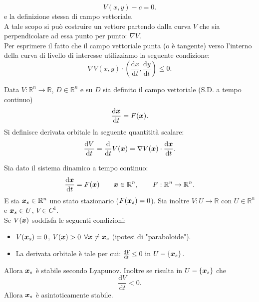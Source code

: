 \[
    V(x, y) - c = 0
.\] 
e la definizione stessa di campo vettoriale.\\
A tale scopo si può costruire un vettore partendo dalla curva $V$ che sia perpendicolare ad essa punto per punto:  $\nabla V$.\\
Per esprimere il fatto che il campo vettoriale punta (o è tangente) verso l'interno della curva di livello di interesse utilizziamo la seguente condizione:
\[
    \nabla V(x, y) \cdot (\frac{\text{d} x}{\text{d} t} , \frac{\text{d} y}{\text{d} t} ) \le 0
.\] 
\begin{defn}
    Data $V:\mathbb{R}^n\to \mathbb{R}$, $D \in \mathbb{R}^n $ e su $D$ sia definito il campo vettoriale (S.D. a tempo continuo)
    \[
	\frac{\text{d} \boldsymbol{x}}{\text{d} t} = F(\boldsymbol{x}) 
    .\] 
    Si definisce derivata orbitale la seguente quantitità scalare:
    \[
	\frac{\text{d} V}{\text{d} t} = \frac{\text{d} }{\text{d} t} V(\boldsymbol{x}) = \nabla V(\boldsymbol{x}) \cdot \frac{\text{d} \boldsymbol{x}}{\text{d} t} 
    .\] 
\end{defn}
\noindent
\begin{thm}
   Sia dato il sistema dinamico a tempo continuo:
   \[
       \frac{\text{d} \boldsymbol{x}}{\text{d} t} = F(\boldsymbol{x}) \qquad  \boldsymbol{x}\in \mathbb{R}^n, \qquad  F:\mathbb{R}^n \to  \mathbb{R}^n
   .\] 
   E sia $\boldsymbol{x}_s\in \mathbb{R}^n$ uno stato stazionario ($F(\boldsymbol{x}_s) = 0$). Sia inoltre $V:U\to \mathbb{R}$ con $U\in \mathbb{R}^n$ e $\boldsymbol{x}_s \in U$, $V \in C^1$.\\
   Se $V(\boldsymbol{x}) $ soddisfa le seguenti condizioni:
   \begin{itemize}
       \item $V(\boldsymbol{x}_s) = 0$, $V(\boldsymbol{x}) >0$ $\forall \boldsymbol{x} \neq \boldsymbol{x}_s$  (ipotesi di "paraboloide").
       \item La derivata orbitale è tale per cui: $\frac{\text{d} V}{\text{d} t} \le 0 $ in $U - \left\{\boldsymbol{x}_s\right\}$.
   \end{itemize}
   Allora $\boldsymbol{x}_s$ è stabile secondo Lyapunov.  Inoltre se risulta in $U-\left\{\boldsymbol{x}_s\right\}$  che 
   \[
       \frac{\text{d} V}{\text{d} t} < 0 
   .\] 
   Allora $\boldsymbol{x}_s$ è asintoticamente stabile.
\end{thm}
\noindent
